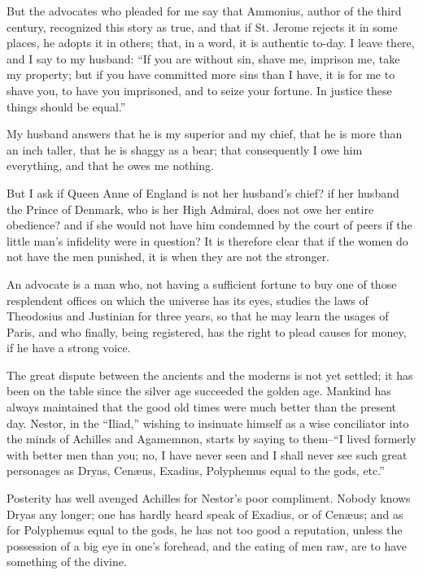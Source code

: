 But the advocates who pleaded for me say that Ammonius, author of the
third century, recognized this story as true, and that if St. Jerome
rejects it in some places, he adopts it in others; that, in a word, it
is authentic to-day. I leave there, and I say to my husband: \enquote{If you are
without sin, shave me, imprison me, take my property; but if you have
committed more sins than I have, it is for me to shave you, to have you
imprisoned, and to seize your fortune. In justice these things should be
equal.}

My husband answers that he is my superior and my chief, that he is more
than an inch taller, that he is shaggy as a bear; that consequently I
owe him everything, and that he owes me nothing.

But I ask if Queen Anne of England is not her husband's chief? if her
husband the Prince of Denmark, who is her High Admiral, does not owe her
entire obedience? and if she would not have him condemned by the court
of peers if the little man's infidelity were in question? It is
therefore clear that if the women do not have the men punished, it is
when they are not the stronger.


An advocate is a man who, not having a sufficient fortune to buy one of
those resplendent offices on which the universe has its eyes, studies
the laws of Theodosius and Justinian for three years, so that he may
learn the usages of Paris, and who finally, being registered, has the
right to plead causes for money, if he have a strong voice.






The great dispute between the ancients and the moderns is not yet
settled; it has been on the table since the silver age succeeded the
golden age. Mankind has always maintained that the good old times were
much better than the present day. Nestor, in the \enquote{Iliad,} wishing to
insinuate himself as a wise conciliator into the minds of Achilles and
Agamemnon, starts by saying to them--\enquote{I lived formerly with better men
than you; no, I have never seen and I shall never see such great
personages as Dryas, Cenæus, Exadius, Polyphemus equal to the gods,
etc.}

Posterity has well avenged Achilles for Nestor's poor compliment. Nobody
knows Dryas any longer; one has hardly heard speak of Exadius, or of
Cenæus; and as for Polyphemus equal to the gods, he has not too good a
reputation, unless the possession of a big eye in one's forehead, and
the eating of men raw, are to have something of the divine.

